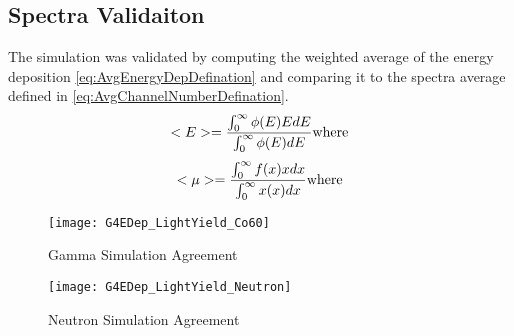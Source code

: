 \subsection{Spectra Validaiton}
The simulation was validated by computing the weighted average of the energy deposition \ref{eq:AvgEnergyDepDefination} and comparing it to the spectra average defined in \ref{eq:AvgChannelNumberDefination}.
\begin{equation}
\label{eq:AvgEnergyDepDefination}
<E> = \frac{\int_0^\infty {\phi(E)EdE}}{\int_0^\infty{\phi(E)dE}} \\
\text{where}
\end{equation}
\begin{equation}
\label{eq:AvgChannelNumberDefination}
<\mu> = \frac{\int_0^\infty {f(x)xdx}}{\int_0^\infty{x(x)dx}} \\
\text{where}
\end{equation}
\begin{figure}
    \centering
    \caption{Gamma Simulation Agreement}
    \texttt{[image: G4EDep\_LightYield\_Co60]}
    \label{fig:GammaSimAgreement}
\end{figure}
\begin{figure}
    \centering
    \caption{Neutron Simulation Agreement}
    \texttt{[image: G4EDep\_LightYield\_Neutron]}
    \label{fig:NeutronSimAgreement}
\end{figure}


